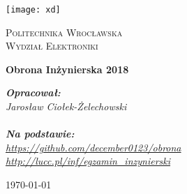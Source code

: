 \begin{titlepage}
	\centering
	\texttt{[image: xd]}\par\vspace{1cm}
	{\scshape\LARGE Politechnika Wrocławska\\ Wydział Elektroniki \par}
	\vspace{2.5cm}
	{\huge\bfseries Obrona Inżynierska 2018\par}
	\vspace{2cm}
	{\Large\itshape \textbf{Opracował:}\\Jarosław Ciołek-Żelechowski\\\textbf{\\Na podstawie:}\\\url{https://github.com/december0123/obrona}\\\url{http://lucc.pl/inf/egzamin_inzynierski}\par}
	
	\vfill
	
	{\large \today\par}
\end{titlepage}